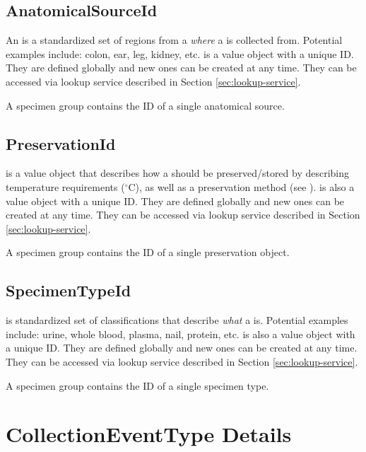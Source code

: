\subsection*{AnatomicalSourceId}

An  is a standardized set of regions from a
 \emph{where} a  is collected
from. Potential examples include: colon, ear, leg, kidney,
etc.  is a value object with a unique ID. They are
defined globally and new ones can be created at any time. They can be accessed
via lookup service described in Section \ref{sec:lookup-service}.

A specimen group contains the ID of a single anatomical source.

\subsection*{PreservationId}

 is a value object that describes how a
 should be preserved/stored by describing temperature
requirements ($^\circ$C), as well as a preservation method (see
).  is also a value
object with a unique ID. They are defined globally and new ones can be created
at any time. They can be accessed via lookup service described in Section
\ref{sec:lookup-service}.

A specimen group contains the ID of a single preservation object.

\subsection*{SpecimenTypeId}

 is standardized set of classifications that describe
\emph{what} a  is. Potential examples include: urine,
whole blood, plasma, nail, protein, etc. is also a value
object with a unique ID. They are defined globally and new ones can be created
at any time. They can be accessed via lookup service described in Section
\ref{sec:lookup-service}.

A specimen group contains the ID of a single specimen type.

\section{CollectionEventType Details}
\label{sec:collection-event-type}

